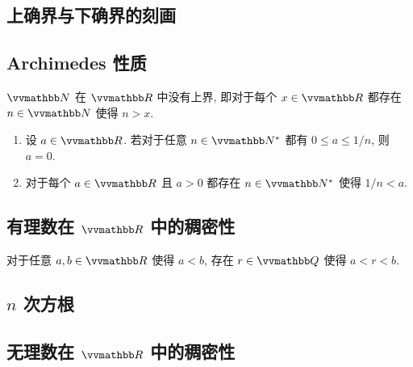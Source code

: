 \subsection{上确界与下确界的刻画}

\begin{proposition}\label{prop:supremum-and-infimum-in-R}
    
\end{proposition}

\subsection{Archimedes 性质}

\begin{proposition}[Archimedes 性质]
    \(\N\) 在 \(\R\) 中没有上界, 即对于每个 \(x \in \R\) 都存在 \(n \in \N\) 使得 \(n > x\).
\end{proposition}

\begin{corollary}\label{cor:archimedean-property-cor}
    \begin{enumerate}
        \item 设 \(a \in \R\). 若对于任意 \(n \in \N^\ast\) 都有 \(0 \leq a \leq 1 / n\), 则 \(a = 0\).
        \item 对于每个 \(a \in \R\) 且 \(a > 0\) 都存在 \(n \in \N^\ast\) 使得 \(1 / n < a\).
    \end{enumerate}
\end{corollary}

\subsection{有理数在 \(\R\) 中的稠密性}

\begin{proposition}\label{prop:Q-density-in-R}
    对于任意 \(a, b \in \R\) 使得 \(a < b\), 存在 \(r \in \Q\) 使得 \(a < r < b\).
\end{proposition}

\subsection{\(n\) 次方根}

\begin{remark}\label{rem:n-roots}
    
\end{remark}

\subsection{无理数在 \(\R\) 中的稠密性}

